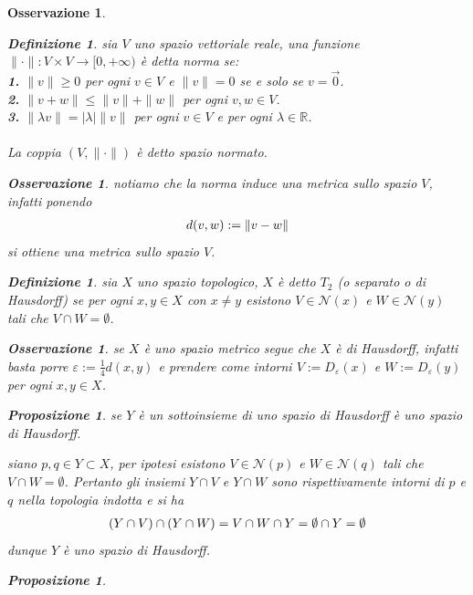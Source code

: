 \documentclass[oneside, 11pt]{amsbook}
\makeatletter
\newcommand{\0}{{(0)}}
\newcommand{\3}{{(3)}}
\theoremstyle{colonplain}
\newtheorem{prop}[thm]{Proposizione}
\theoremstyle{colondefinition}
\newtheorem{defn}[thm]{Definizione}
\theoremstyle{colonremark}
\newtheorem{rmk}[thm]{Osservazione}
\numberwithin{equation}{chapter}
\renewcommand{\proofname}{Dimostrazione}
\renewenvironment{proof}[1][\proofname]{\par
  \pushQED{\end{proof}}%
  \normalfont \topsep6\p@\@plus6\p@\relax
  \trivlist
  \item[\hskip\labelsep\bfseries #1:]\ignorespaces
}{%
  \popQED\endtrivlist\@endpefalse
}
\makeatother
\begin{document}
\begin{rmk}
\begin{defn}
sia $V$ uno spazio vettoriale reale, una funzione $\| \cdot \| : V \times V \longrightarrow [0, +\infty)$ è detta \textit{norma} se: \\
\textbf{1.} $\| v \| \geq 0$ per ogni $v \in V$ e $\| v \| = 0$ se e solo se $v = \vec{0}$. \\
\textbf{2.} $\| v + w \| \leq \| v \| + \| w \|$ per ogni $v, w \in V$. \\
\textbf{3.} $\| \lambda v \| = |\lambda| \| v \|$ per ogni $v \in V$ e per ogni $\lambda \in \mathbb{R}$. \\ \\
La coppia $(V, \| \cdot \|)$ è detto \textit{spazio normato}.
\end{defn}
\begin{rmk}
notiamo che la norma induce una metrica sullo spazio $V$, infatti ponendo
\begin{align}
    d(v, w) := \|v - w\| \notag
\end{align}
si ottiene una metrica sullo spazio $V$.
\end{rmk}
\begin{defn}
sia $X$ uno spazio topologico, $X$ è detto $T_2$ (o \textit{separato} o \textit{di Hausdorff}) se per ogni $x, y \in X$ con $x \neq y$ esistono $V \in \mathcal{N}(x)$ e $W \in \mathcal{N}(y)$ tali che $V \cap W = \emptyset$.
\end{defn}
\begin{rmk}
se $X$ è uno spazio metrico segue che $X$ è di Hausdorff, infatti basta porre $\varepsilon := \frac{1}{4}d(x, y)$ e prendere come intorni $V := D_\varepsilon(x)$ e $W := D_\varepsilon(y)$ per ogni $x, y \in X$.
\end{rmk}
\begin{prop}
se $Y$ è un sottoinsieme di uno spazio di Hausdorff è uno spazio di Hausdorff.
\end{prop}
\begin{proof}
siano $p, q \in Y \subset X$, per ipotesi esistono $V \in \mathcal{N}(p)$ e $W \in \mathcal{N}(q)$ tali che $V \cap W = \emptyset$. Pertanto gli insiemi $Y \cap V$ e $Y \cap W$ sono rispettivamente intorni di $p$ e $q$ nella topologia indotta e si ha
\begin{align}
    (Y \cap V) \cap (Y \cap W) = V \cap W \cap Y = \emptyset \cap Y = \emptyset \notag
\end{align}
dunque $Y$ è uno spazio di Hausdorff.
\end{proof}
\begin{prop}

\end{prop}
\end{rmk}
\end{document}
